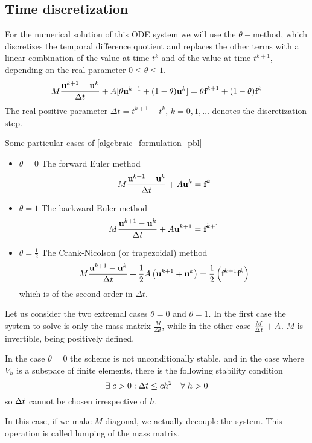 \subsection{Time discretization}
For the numerical solution of this ODE system we will use the \(\theta-\)method, which discretizes the temporal difference quotient and replaces the other terms with a linear combination of the value at time \(t^k\) and of the value at time \(t^{k+1}\), depending on the real parameter \(0 \leq \theta \leq 1\).
\begin{equation}
    M\frac{\textbf{u}^{k+1} - \textbf{u}^k}{\Delta t} + A[\theta \textbf{u}^{k+1} + (1-\theta)\textbf{u}^k] = \theta \textbf{f}^{k+1} + (1-\theta)\textbf{f}^k
    \label{theta_method_pbl}
\end{equation}
The real positive parameter \(\Delta t = t^{k+1}-t^k\), \(k=0,1,\ldots\) denotes the discretization step.

Some particular cases of \eqref{algebraic_formulation_pbl} 
\begin{itemize}
    \item \(\theta = 0\) The forward Euler method 
    \[
        M\frac{\textbf{u}^{k+1}-\textbf{u}^k}{\Delta t} + A\textbf{u}^{k} = \textbf{f}^k
    \]
    \item \(\theta = 1\) The backward Euler method 
    \[
        M\frac{\textbf{u}^{k+1}-\textbf{u}^k}{\Delta t} + A\textbf{u}^{k+1} = \textbf{f}^{k+1}        
    \]
    \item \(\theta = \frac{1}{2}\) The Crank-Nicolson (or trapezoidal) method
    \[
        M\frac{\textbf{u}^{k+1}-\textbf{u}^k}{\Delta t} + \frac{1}{2}A\left( \textbf{u}^{k+1} + \textbf{u}^k \right) = \frac{1}{2}\left( \textbf{f}^{k+1} \textbf{f}^k \right)
    \]
    which is of the second order in \(\Delta t\). 
\end{itemize}
Let us consider the two extremal cases \(\theta = 0\) and \(\theta = 1\). In the first case the system to solve is only the mass matrix \(\frac{M}{\Delta t}\), while in the other case \(\frac{M}{\Delta t} + A\). \(M\) is invertible, being positively defined.

In the case \(\theta = 0\) the scheme is not unconditionally stable, and in the case where \(V_h\) is a subspace of finite elements, there is the following stability condition 
\[
    \exists \; c > 0 : \Delta t \leq ch^2 \quad \forall \; h > 0
\]
so \(\Delta t\) cannot be chosen irrespective of \(h\).

In this case, if we make \(M\) diagonal, we actually decouple the system. This operation is called lumping of the mass matrix.

